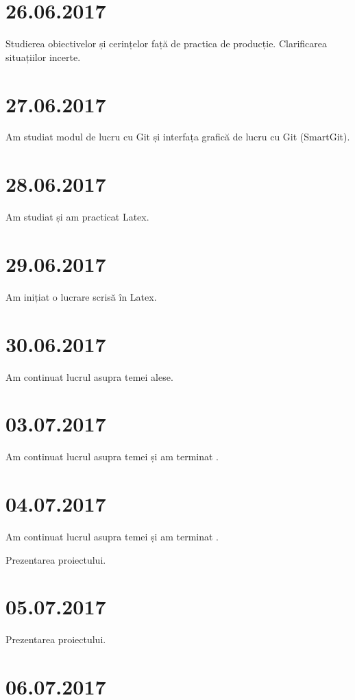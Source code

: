 \documentclass{report}
\begin{document}
\chapter{26.06.2017}

Studierea obiectivelor și cerințelor față de practica de producție. Clarificarea situațiilor incerte.

\chapter{27.06.2017}

Am studiat modul de lucru cu Git și interfața grafică de lucru cu Git (SmartGit).

\chapter{28.06.2017}

Am studiat și am practicat Latex.

\chapter{29.06.2017}

Am inițiat o lucrare scrisă în Latex.

\chapter{30.06.2017}

Am continuat lucrul asupra temei alese.

\chapter{03.07.2017}

Am continuat lucrul asupra temei și am terminat .

\chapter{04.07.2017}

Am continuat lucrul asupra temei și am terminat .

Prezentarea proiectului.

\chapter{05.07.2017}

Prezentarea proiectului.

\chapter{06.07.2017}
\end{document}
